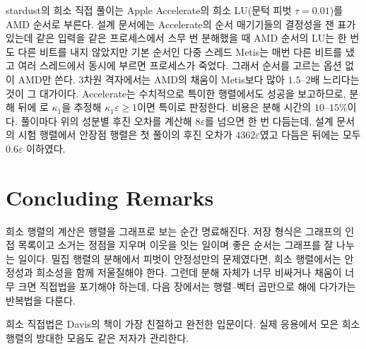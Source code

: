 \begin{instardust}
stardust의 희소 직접 풀이는 Apple Accelerate의 희소 LU(문턱 피벗 $\tau=0.01$)를 AMD 순서로 부른다. 설계 문서에는 Accelerate의 순서 매기기들의 결정성을 잰 표가 있는데 같은 입력을 같은 프로세스에서 스무 번 분해했을 때 AMD 순서의 LU는 한 번도 다른 비트를 내지 않았지만 기본 순서인 다중 스레드 Metis는 매번 다른 비트를 냈고 여러 스레드에서 동시에 부르면 프로세스가 죽었다. 그래서 순서를 고르는 옵션 없이 AMD만 쓴다. 3차원 격자에서는 AMD의 채움이 Metis보다 많아 $1.5$--$2$배 느리다는 것이 그 대가이다. Accelerate는 수치적으로 특이한 행렬에서도 성공을 보고하므로, 분해 뒤에 로 $\kappa_1$을 추정해 $\kappa_1\varepsilon\ge1$이면 특이로 판정한다. 비용은 분해 시간의 $10$--$15\%$이다. 풀이마다 위의 성분별 후진 오차를 계산해 $8\varepsilon$를 넘으면 한 번 다듬는데, 설계 문서의 시험 행렬에서 안장점 행렬은 첫 풀이의 후진 오차가 $4362\varepsilon$였고 다듬은 뒤에는 모두 $0.6\varepsilon$ 이하였다.
\end{instardust}

\section{Concluding Remarks}

희소 행렬의 계산은 행렬을 그래프로 보는 순간 명료해진다. 저장 형식은 그래프의 인접 목록이고 소거는 정점을 지우며 이웃을 잇는 일이며 좋은 순서는 그래프를 잘 나누는 일이다. 밀집 행렬의 분해에서 피벗이 안정성만의 문제였다면, 희소 행렬에서는 안정성과 희소성을 함께 저울질해야 한다. 그런데 분해 자체가 너무 비싸거나 채움이 너무 크면 직접법을 포기해야 하는데, 다음 장에서는 행렬--벡터 곱만으로 해에 다가가는 반복법을 다룬다.

희소 직접법은 Davis의 책\cite{davis2006direct}이 가장 친절하고 완전한 입문이다. 실제 응용에서 모은 희소 행렬의 방대한 모음도 같은 저자가 관리한다\cite{davis2011collection}.

\chapterreferences
